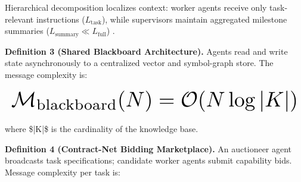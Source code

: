 \documentclass{article}
\begin{document}
Hierarchical decomposition localizes context: worker agents receive only task-relevant instructions ($L_{\text{task}}$), while supervisors maintain aggregated milestone summaries ($L_{\text{summary}} \ll L_{\text{full}}$) \cite{arxiv_2406_00584}.

\textbf{Definition 3 (Shared Blackboard Architecture).} Agents read and write state asynchronously to a centralized vector and symbol-graph store. The message complexity is:


























\begin{equation}
\resizebox{\columnwidth}{!}{$\displaystyle
\begin{aligned}
\mathcal{M}_{\text{blackboard}}(N) = \mathcal{O}(N \log |K|)
\end{aligned}
$}
\end{equation}


























where \$|K|\$ is the cardinality of the knowledge base.

\textbf{Definition 4 (Contract-Net Bidding Marketplace).} An auctioneer agent broadcasts task specifications; candidate worker agents submit capability bids. Message complexity per task is:
\end{document}
